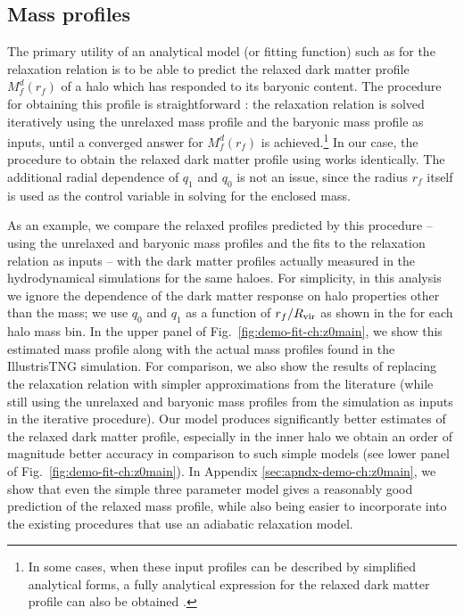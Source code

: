 \subsection{Mass profiles}
\label{sec:mass-prof-demo-ch:z0main}
The primary utility of an analytical model (or fitting function) such as  for the relaxation relation is to be able to predict the relaxed dark matter profile $M_f^d(r_f)$ of a halo which has responded to its baryonic content. The procedure for obtaining this profile is straightforward \citep[see, e.g., Appendix A of][]{2021MNRAS.503.4147P}: the relaxation relation is solved iteratively using the unrelaxed mass profile and the baryonic mass profile as inputs, until a converged answer for $M_f^d(r_f)$ is achieved.\footnote{In some cases, when these input profiles can be described by simplified analytical forms, a fully analytical expression for the relaxed dark matter profile can also be obtained \citep[see, e.g., Appendix A of][]{2021MNRAS.507..632P}.} In our case, the procedure to obtain the relaxed dark matter profile using  works identically. The additional radial dependence of $q_1$ and $q_0$ is not an issue, since the radius $r_f$ itself is used as the control variable in solving for the enclosed mass.


As an example, we compare the relaxed profiles predicted by this procedure -- using the unrelaxed and baryonic mass profiles and the fits to the relaxation relation  as inputs -- with the dark matter profiles actually measured in the hydrodynamical simulations for the same haloes.
For simplicity, in this analysis we ignore the dependence of the dark matter response on halo properties other than the mass;
we use $q_0$ and $q_1$ as a function of $r_f/R_{\rm{vir}}$ as shown in the  for each halo mass bin. In the upper panel of Fig.~\ref{fig:demo-fit-ch:z0main}, we show this estimated mass profile along with the actual mass profiles found in the IllustrisTNG simulation.
For comparison, we also show the results of replacing the relaxation relation with simpler approximations from the literature (while still using the unrelaxed and baryonic mass profiles from the simulation as inputs in the iterative procedure).
Our model produces significantly better estimates of the relaxed dark matter profile, especially in the inner halo we obtain an order of magnitude better accuracy in comparison to such simple models (see lower panel of Fig.~\ref{fig:demo-fit-ch:z0main}). In Appendix \ref{sec:apndx-demo-ch:z0main}, we show that even the simple three parameter model gives a reasonably good prediction of the relaxed mass profile, while also being easier to incorporate into the existing procedures that use an adiabatic relaxation model. 


